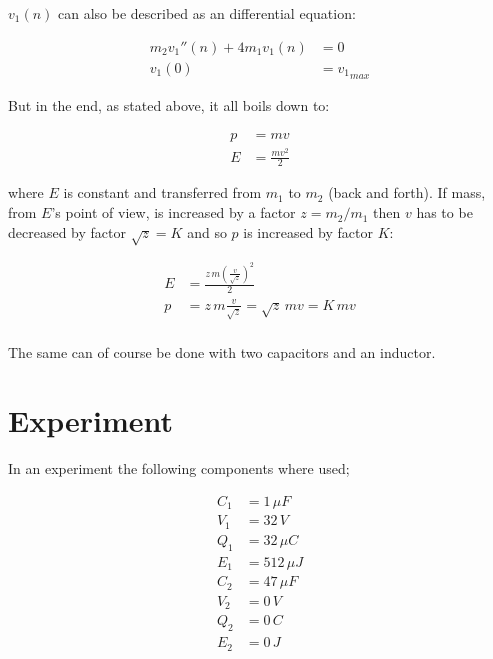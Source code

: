 \documentclass[]{../common/elementary-physics}
\begin{document}
$v_1(n)$ can also be described as an differential equation:

\begin{subequations}
\begin{align}
m_2 v_1''(n) + 4 m_1 v_1(n) &= 0 \\
v_1(0) &= {v_1}_{max}
\end{align}
\end{subequations}

But in the end, as stated above, it all boils down to:

\begin{subequations}
\begin{align}
p &= m v\\
E &= \frac{m v^2}{2}
\end{align}
\end{subequations}

where $E$ is constant and transferred from $m_1$ to $m_2$ (back and forth).
If mass, from $E$'s point of view, is increased by a factor $z=m_2/m_1$ then $v$ has to be decreased by factor $\sqrt{z}=K$ and so $p$ is increased by factor $K$:

\begin{subequations}
\begin{align}
E &= \frac{z\,m \left( \frac{v}{\sqrt{z}} \right)^2}{2} \\
p &= z\,m \frac{v}{\sqrt{z}} = \sqrt{z}\,m v = K\,m v \\
\end{align}
\end{subequations}

The same can of course be done with two capacitors and an inductor.

\pagebreak

\section{Experiment}

In an experiment the following components where used;

\begin{subequations}
\begin{align}
C_1 &= 1 \, \mu F \\
V_1 &= 32 \, V \\
Q_1 &= 32 \, \mu C \\
E_1 &= 512 \, \mu J \\
C_2 &= 47 \, \mu F \\
V_2 &= 0 \, V \\
Q_2 &= 0 \, C \\
E_2 &= 0 \, J
\end{align}
\end{subequations}
\end{document}
